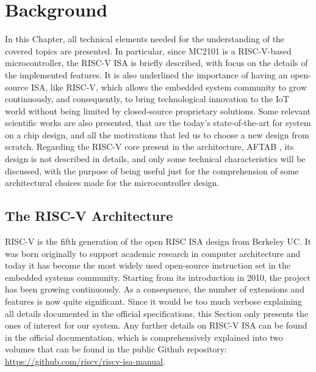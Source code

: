 \chapter{Background}
In this Chapter, all technical elements needed for the understanding of the covered topics are presented.
In particular, since MC2101 is a RISC-V-based microcontroller, the RISC-V ISA is briefly described, with focus on the details of the implemented features. It is also underlined the importance of having an open-source ISA, like RISC-V, which allows the embedded system community to grow continuously, and consequently, to bring technological innovation to the IoT world without being limited by closed-source proprietary solutions. Some relevant scientific works are also presented, that are the today's state-of-the-art for system on a chip design, and all the motivations that led us to choose a new design from scratch. Regarding the RISC-V core present in the architecture, AFTAB \cite{aftab}, its design is not described in details, and only some technical characteristics will be discussed, with the purpose of being useful just for the comprehension of some architectural choices made for the microcontroller design.

\section{The RISC-V Architecture}
RISC-V is the fifth generation of the open RISC ISA design from Berkeley UC.
It was born originally to support academic research in computer architecture and today it has become the most widely used open-source instruction set in the embedded systems community. Starting from its introduction in 2010, the project has been growing continuously.
As a consequence, the number of extensions and features is now quite significant. Since it would be too much verbose explaining all details documented in the official specifications, this Section only presents the ones of interest for our system.\vspace{5mm} \newline
Any further details on RISC-V ISA can be found in the official documentation, which is comprehensively explained into two volumes that can be found in the public Github repository: \url{https://github.com/riscv/riscv-isa-manual}.

